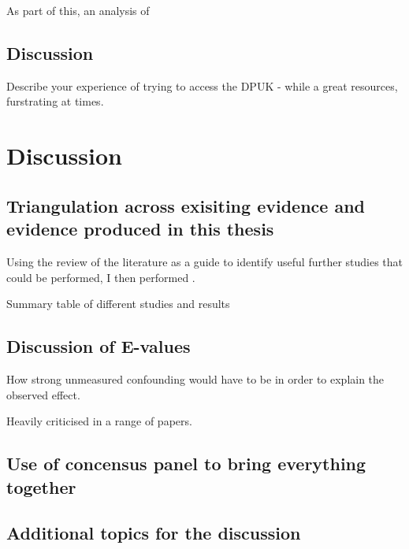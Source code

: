 \documentclass[a4paper, twoside]{templates/ociamthesis}
\begin{document}
As part of this, an analysis of

\hypertarget{discussion-4}{%
\section{Discussion}\label{discussion-4}}

Describe your experience of trying to access the DPUK - while a great resources, furstrating at times.

\hypertarget{discussion-heading}{%
\chapter{Discussion}\label{discussion-heading}}

\hypertarget{triangulation-across-exisiting-evidence-and-evidence-produced-in-this-thesis}{%
\section{Triangulation across exisiting evidence and evidence produced in this thesis}\label{triangulation-across-exisiting-evidence-and-evidence-produced-in-this-thesis}}

Using the review of the literature as a guide to identify useful further studies that could be performed, I then performed .

Summary table of different studies and results

\hypertarget{discussion-of-e-values}{%
\section{Discussion of E-values}\label{discussion-of-e-values}}

How strong unmeasured confounding would have to be in order to explain the observed effect.

Heavily criticised in a range of papers.

\hypertarget{use-of-concensus-panel-to-bring-everything-together}{%
\section{Use of concensus panel to bring everything together}\label{use-of-concensus-panel-to-bring-everything-together}}

\hypertarget{additional-topics-for-the-discussion}{%
\section{Additional topics for the discussion}\label{additional-topics-for-the-discussion}}
\end{document}

